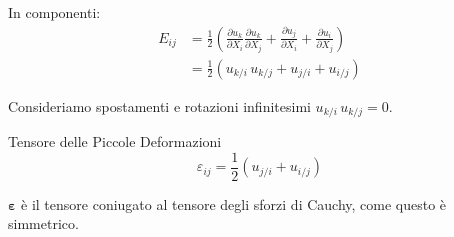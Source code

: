 In componenti:
\begin{align*}
E_{ij} &= \frac{1}{2} \left( \frac{\partial u_k}{\partial X_i} \frac{\partial u_k}{\partial X_j} + \frac{\partial u_j}{\partial X_i} + \frac{\partial u_i}{\partial X_j} \right) \\
&= \frac{1}{2} \left( u_{k/i} \, u_{k/j} + u_{j/i} + u_{i/j} \right) 
\end{align*}

Consideriamo spostamenti e rotazioni infinitesimi $ u_{k/i} \, u_{k/j}  = 0$.
\begin{definizioneBox}
Tensore delle Piccole Deformazioni
    \begin{equation*}
\varepsilon_{ij} = \frac{1}{2} \left( u_{j/i} + u_{i/j} \right) 
\end{equation*}
\end{definizioneBox}

$\boldsymbol{\varepsilon}$ è il tensore coniugato al tensore degli sforzi di Cauchy, come questo è simmetrico.







